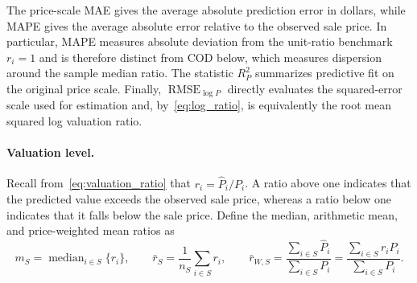\documentclass[10pt]{article}
\theoremstyle{definition}
\newcommand{\1}{\mathbf{1}}
\begin{document}

{The price-scale MAE gives the average absolute prediction error in dollars, while MAPE gives the average absolute error relative to the observed sale price. In particular, MAPE measures absolute deviation from the unit-ratio benchmark $r_i=1$ and is therefore distinct from COD below, which measures dispersion around the sample median ratio. The statistic $R^2_P$ summarizes predictive fit on the original price scale. Finally, $\operatorname{RMSE}_{\log P}$ directly evaluates the squared-error scale used for estimation and, by~\eqref{eq:log_ratio}, is equivalently the root mean squared log valuation ratio.}


\paragraph{Valuation level.}
Recall from~\eqref{eq:valuation_ratio} that $r_i=\widehat P_i/P_i$. A ratio above one indicates that the predicted value exceeds the observed sale price, whereas a ratio below one indicates that it falls below the sale price. Define the median, arithmetic mean, and price-weighted mean ratios as
\begin{equation}
\label{eq:level_ratios}
m_S
=
\operatorname{median}_{i\in S}\{r_i\},
\qquad
\bar r_S
=
\frac{1}{n_S}\sum_{i\in S}r_i,
\qquad
\bar r_{W,S}
=
\frac{\sum_{i\in S}\widehat P_i}{\sum_{i\in S}P_i}
=
\frac{\sum_{i\in S}r_iP_i}{\sum_{i\in S}P_i}.
\end{equation}
\end{document}
